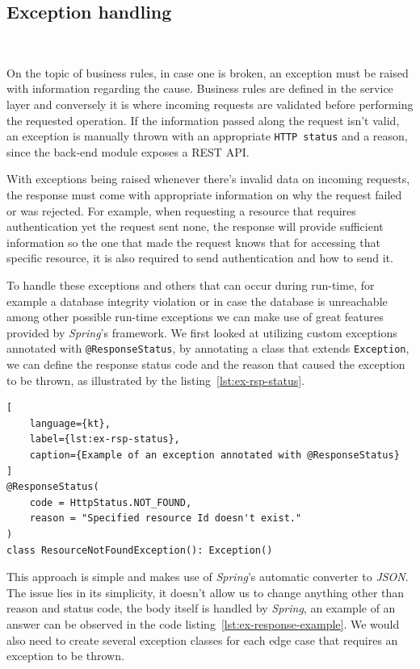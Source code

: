 \subsection{Exception handling}~\label{ch:impl:sec:be:subsec:exceptions}

On the topic of business rules, in case one is broken, an exception must be raised with information regarding the cause. Business rules are defined in the service layer and conversely it is where incoming requests are validated before performing the requested operation. If the information passed along the request isn't valid, an exception is manually thrown with an appropriate \lstinline{HTTP status} and a reason, since the back-end module exposes a REST API. 


With exceptions being raised whenever there's invalid data on incoming requests, the response must come with appropriate information on why the request failed or was rejected. For example, when requesting a resource that requires authentication yet the request sent none, the response will provide sufficient information so the one that made the request knows that for accessing that specific resource, it is also required to send authentication and how to send it.


To handle these exceptions and others that can occur during run-time, for example a database integrity violation or in case the database is unreachable among other possible run-time exceptions we can make use of great features provided by \textit{Spring}'s framework. We first looked at utilizing custom exceptions annotated with \lstinline{@ResponseStatus}, by annotating a class that extends \lstinline[keywordstyle=\color{black},commentstyle=\color{black},stringstyle=\color{black}]{Exception}, we can define the response status code and the reason that caused the exception to be thrown, as illustrated by the listing~\ref{lst:ex-rsp-status}. 

\begin{lstlisting}[
    language={kt},
    label={lst:ex-rsp-status},
    caption={Example of an exception annotated with @ResponseStatus}
]
@ResponseStatus(
    code = HttpStatus.NOT_FOUND, 
    reason = "Specified resource Id doesn't exist."
)
class ResourceNotFoundException(): Exception()
\end{lstlisting}

This approach is simple and makes use of \textit{Spring}'s automatic converter to \textit{JSON}. The issue lies in its simplicity, it doesn't allow us to change anything other than reason and status code, the body itself is handled by \textit{Spring}, an example of an answer can be observed in the code listing~\ref{lst:ex-response-example}. 
We would also need to create several exception classes for each edge case that requires an exception to be thrown.

